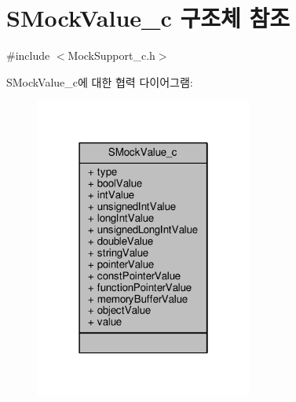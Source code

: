 \hypertarget{struct_s_mock_value__c}{}\section{S\+Mock\+Value\+\_\+c 구조체 참조}
\label{struct_s_mock_value__c}


{\ttfamily \#include $<$Mock\+Support\+\_\+c.\+h$>$}



S\+Mock\+Value\+\_\+c에 대한 협력 다이어그램\+:
\nopagebreak
\begin{figure}[H]
\begin{center}
\leavevmode
\includegraphics[width=202pt]{struct_s_mock_value__c__coll__graph}
\end{center}
\end{figure}
